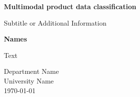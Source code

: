 
	\begin{titlepage}
		\centering
		\vspace*{1cm}
		\Huge
		\textbf{Multimodal product data classification}
		
		\vspace{0.5cm}
		\LARGE
		Subtitle or Additional Information
		
		\vspace{1.5cm}
		
		\textbf{Names}
		
		\vfill
		
		Text
		
		\vspace{0.8cm}
		
		\Large
		Department Name\\
		University Name\\
		\today %
	\end{titlepage}
